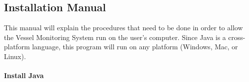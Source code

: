 \documentclass{article}
\begin{document}

\subsection{Installation Manual}

This manual will explain the procedures that need to be done in order to allow the Vessel Monitoring System run on the user's computer. Since Java is a cross-platform language, this program will run on any platform (Windows, Mac, or Linux).

\paragraph{Install Java \\}
\end{document}
